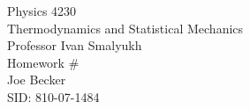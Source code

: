\begin{titlepage}
\setlength{\topmargin}{1.5in}
\begin{center}
\Huge{Physics 4230} \\
\LARGE{Thermodynamics and Statistical Mechanics} \\
\Large{Professor Ivan Smalyukh} \\[1cm]

\huge{Homework \#\HWnum}\\[0.5cm]

\large{Joe Becker} \\
\large{SID: 810-07-1484} \\
\large{\due} 

\end{center}

\end{titlepage}

